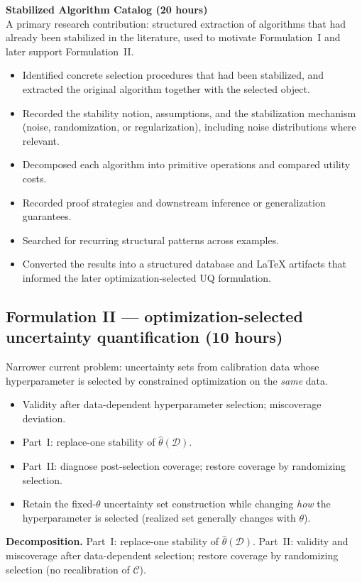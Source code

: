 \documentclass[11pt]{article}
\begin{document}
\begin{tcolorbox}[catalogbox]
{\large\bfseries\color{navy} Stabilized Algorithm Catalog (20 hours)}\\[3pt]
A primary research contribution: structured extraction of algorithms that had already been
stabilized in the literature, used to motivate Formulation~I and later support Formulation~II.
\begin{itemize}
  \item Identified concrete selection procedures that had been stabilized, and extracted the
        original algorithm together with the selected object.
  \item Recorded the stability notion, assumptions, and the stabilization mechanism
        (noise, randomization, or regularization), including noise distributions where relevant.
  \item Decomposed each algorithm into primitive operations and compared utility costs.
  \item Recorded proof strategies and downstream inference or generalization guarantees.
  \item Searched for recurring structural patterns across examples.
  \item Converted the results into a structured database and LaTeX artifacts that informed
        the later optimization-selected UQ formulation.
\end{itemize}
\end{tcolorbox}

\subsection{Formulation II --- optimization-selected uncertainty quantification (10 hours)}
\begin{tcolorbox}[featurebox, breakable=false, title=Formulation II]
Narrower current problem: uncertainty sets from calibration data whose hyperparameter is
selected by constrained optimization on the \emph{same} data.
\begin{itemize}
  \item Validity after data-dependent hyperparameter selection; miscoverage deviation.
  \item Part~I: replace-one stability of $\hat\theta(\mathcal{D})$.
  \item Part~II: diagnose post-selection coverage; restore coverage by randomizing selection.
  \item Retain the fixed-$\theta$ uncertainty set construction while changing
        \emph{how} the hyperparameter is selected (realized set generally changes with $\theta$).
\end{itemize}
\textbf{Decomposition.} Part~I: replace-one stability of $\hat\theta(\mathcal{D})$.
Part~II: validity and miscoverage after data-dependent selection; restore coverage by
randomizing selection (no recalibration of $\mathcal{C}$).
\end{tcolorbox}
\end{document}
